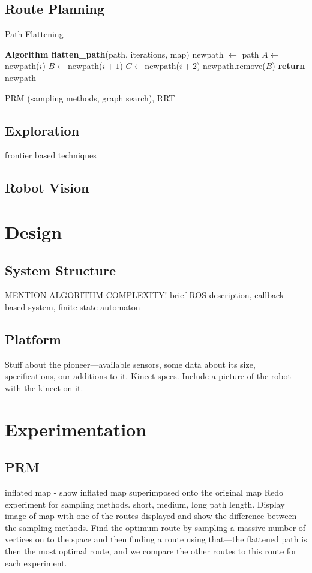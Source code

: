 \documentclass[conference]{IEEEtran}
\begin{document}
\subsection{Route Planning}
\begin{algorithm}
  \caption{Path Flattening}
  \label{alg:pathflat}
  \begin{algorithmic}[1]
    \State \textbf{Algorithm flatten\_path}\textnormal{(path, iterations, map)}
    \State \textnormal{newpath $\gets$ path}
    \State $A \gets $\textnormal{newpath($i$)}
    \State $B \gets $\textnormal{newpath($i+1$)}
    \State $C \gets $\textnormal{newpath($i+2$)}
    \State \textnormal{newpath.remove($B$)}
    \EndIf
    \EndFor
    \EndFor
    \State \textbf{return}\textnormal{ newpath}
  \end{algorithmic}
\end{algorithm}
PRM (sampling methods, graph search), RRT
\subsection{Exploration}
frontier based techniques
\subsection{Robot Vision}
\section{Design}
\subsection{System Structure}
MENTION ALGORITHM COMPLEXITY!
brief ROS description, callback based system, finite state automaton
\subsection{Platform}
Stuff about the pioneer---available sensors, some data about its size, specifications, our additions to it. Kinect specs. Include a picture of the robot with the kinect on it. 
\section{Experimentation}
\subsection{PRM}
inflated map - show inflated map superimposed onto the original map
Redo experiment for sampling methods. short, medium, long path length. Display image of map with one of the routes displayed and show the difference between the sampling methods. Find the optimum route by sampling a massive number of vertices on to the space and then finding a route using that---the flattened path is then the most optimal route, and we compare the other routes to this route for each experiment.
\end{document}

